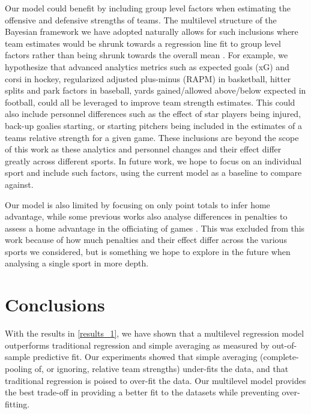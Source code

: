 Our model could benefit by including group level factors when estimating the offensive and defensive strengths of teams. The multilevel structure of the Bayesian framework we have adopted naturally allows for such inclusions where team estimates would be shrunk towards a regression line fit to group level factors rather than being shrunk towards the overall mean \cite{Gelman2006} \cite{Gelman2014} \cite{McElreath2020}. For example, we hypothesize that advanced analytics metrics such as expected goals (xG) and corsi in hockey, regularized adjusted plus-minus (RAPM) in basketball, hitter splits and park factors in baseball, yards gained/allowed above/below expected in football, could all be leveraged to improve team strength estimates. This could also include personnel differences such as the effect of star players being injured, back-up goalies starting, or starting pitchers being included in the estimates of a teams relative strength for a given game. These inclusions are beyond the scope of this work as these analytics and personnel changes and their effect differ greatly across different sports. In future work, we hope to focus on an individual sport and include such factors, using the current model as a baseline to compare against.

Our model is also limited by focusing on only point totals to infer home advantage, while some previous works also analyse differences in penalties to assess a home advantage in the officiating of games \cite{Benz2020} \cite{Unkelbach2010} \cite{Buraimo2010} \cite{Dohmen2016}. This was excluded from this work because of how much penalties and their effect differ across the various sports we considered, but is something we hope to explore in the future when analysing a single sport in more depth.

\section{Conclusions}

With the results in \ref{results_1}, we have shown that a multilevel regression model outperforms traditional regression and simple averaging as measured by out-of-sample predictive fit. Our experiments showed that simple averaging (complete-pooling of, or ignoring, relative team strengths) under-fits the data, and that traditional regression is poised to over-fit the data. Our multilevel model provides the best trade-off in providing a better fit to the datasets while preventing over-fitting. 

